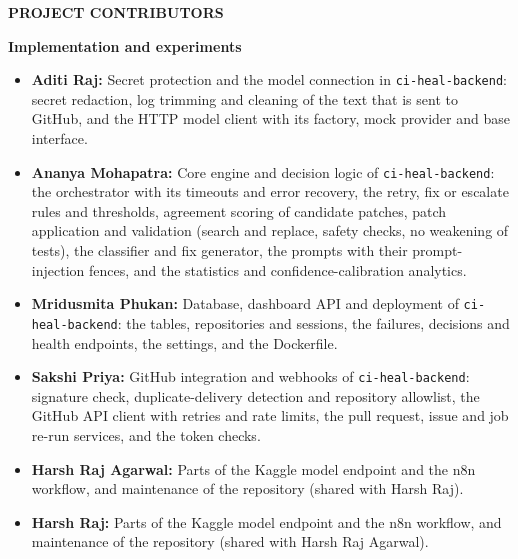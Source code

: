 {}
\begin{center}
  {\LARGE \textbf{PROJECT CONTRIBUTORS}}\\[0.8cm]
\end{center}

\noindent\textbf{Implementation and experiments}
\begin{itemize}[leftmargin=*, itemsep=3pt]
  \item \textbf{Aditi Raj:} Secret protection and the model connection in \texttt{ci-heal-backend}: secret redaction, log trimming and cleaning of the text that is sent to GitHub, and the HTTP model client with its factory, mock provider and base interface.
  \item \textbf{Ananya Mohapatra:} Core engine and decision logic of \texttt{ci-heal-backend}: the orchestrator with its timeouts and error recovery, the retry, fix or escalate rules and thresholds, agreement scoring of candidate patches, patch application and validation (search and replace, safety checks, no weakening of tests), the classifier and fix generator, the prompts with their prompt-injection fences, and the statistics and confidence-calibration analytics.
  \item \textbf{Mridusmita Phukan:} Database, dashboard API and deployment of \texttt{ci-heal-backend}: the tables, repositories and sessions, the failures, decisions and health endpoints, the settings, and the Dockerfile.
  \item \textbf{Sakshi Priya:} GitHub integration and webhooks of \texttt{ci-heal-backend}: signature check, duplicate-delivery detection and repository allowlist, the GitHub API client with retries and rate limits, the pull request, issue and job re-run services, and the token checks.
  \item \textbf{Harsh Raj Agarwal:} Parts of the Kaggle model endpoint and the n8n workflow, and maintenance of the repository (shared with Harsh Raj).
  \item \textbf{Harsh Raj:} Parts of the Kaggle model endpoint and the n8n workflow, and maintenance of the repository (shared with Harsh Raj Agarwal).
\end{itemize}
\clearpage
